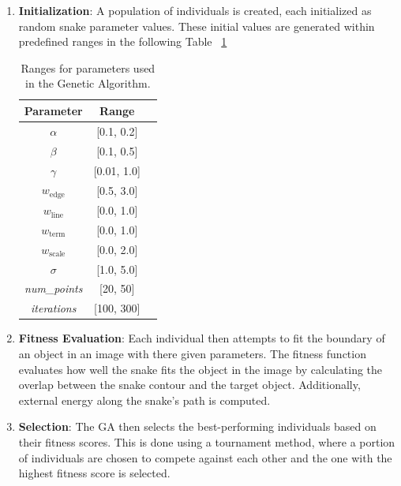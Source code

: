 \documentclass[10pt,twocolumn,letterpaper]{article}
\begin{document}
\begin{enumerate}
    \item \textbf{Initialization}: A population of individuals is created, each initialized as random snake parameter values. These initial values are generated within predefined ranges in the following Table ~\ref{tab:ga_params}
    \begin{table}[h!]
\centering
\begin{tabular}{|c|c|c|}
\hline
\textbf{Parameter}               & \textbf{Range}       \\ \hline
$\alpha$                      & [0.1, 0.2]           \\ \hline
$\beta$                         & [0.1, 0.5]           \\ \hline
$\gamma$                       & [0.01, 1.0]          \\ \hline
$w_{\text{edge}}$                & [0.5, 3.0]           \\ \hline
$w_{\text{line}}$         & [0.0, 1.0]           \\ \hline
$w_{\text{term}}$             & [0.0, 1.0]           \\ \hline
$w_{\text{scale}}$                & [0.0, 2.0]           \\ \hline
$\sigma$                     & [1.0, 5.0]           \\ \hline
\textit{num\_points}   & [20, 50]             \\ \hline
\textit{iterations}   & [100, 300]           \\ \hline
\end{tabular}
\caption{Ranges for parameters used in the Genetic Algorithm.}
\label{tab:ga_params}
\end{table}

    \item \textbf{Fitness Evaluation}: Each individual then attempts to fit the boundary of an object in an image with there given parameters. The fitness function evaluates how well the snake fits the object in the image by calculating the overlap between the snake contour and the target object. Additionally, external energy along the snake’s path is computed. 
    
    \item \textbf{Selection}: The GA then selects the best-performing individuals based on their fitness scores. This is done using a tournament method, where a portion of individuals are chosen to compete against each other and the one with the highest fitness score is selected.
    

\end{enumerate}
\end{document}
